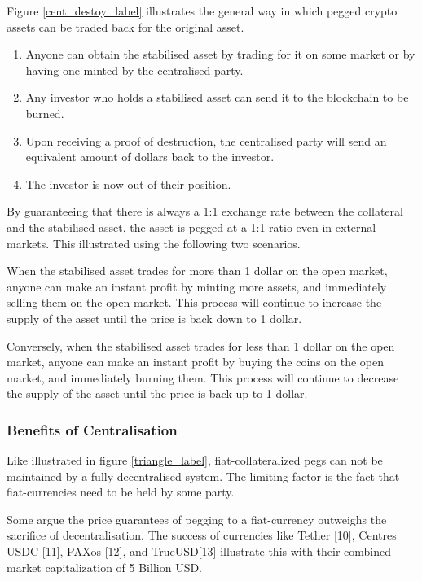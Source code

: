 \documentclass[english,]{IEEEtran}
\providecommand{\tightlist}{%
  \setlength{\itemsep}{0pt}\setlength{\parskip}{0pt}}
\begin{document}
Figure \ref{cent_destoy_label} illustrates the general way in which
pegged crypto assets can be traded back for the original asset.

\begin{enumerate}
\def\labelenumi{\arabic{enumi}.}
\setcounter{enumi}{-1}
\tightlist
\item
  Anyone can obtain the stabilised asset by trading for it on some
  market or by having one minted by the centralised party.
\item
  Any investor who holds a stabilised asset can send it to the
  blockchain to be burned.
\item
  Upon receiving a proof of destruction, the centralised party will send
  an equivalent amount of dollars back to the investor.
\item
  The investor is now out of their position.
\end{enumerate}

By guaranteeing that there is always a 1:1 exchange rate between the
collateral and the stabilised asset, the asset is pegged at a 1:1 ratio
even in external markets. This illustrated using the following two
scenarios.

When the stabilised asset trades for more than 1 dollar on the open
market, anyone can make an instant profit by minting more assets, and
immediately selling them on the open market. This process will continue
to increase the supply of the asset until the price is back down to 1
dollar.

Conversely, when the stabilised asset trades for less than 1 dollar on
the open market, anyone can make an instant profit by buying the coins
on the open market, and immediately burning them. This process will
continue to decrease the supply of the asset until the price is back up
to 1 dollar.

\subsubsection{Benefits of
Centralisation}\label{benefits-of-centralisation}

Like illustrated in figure \ref{triangle_label}, fiat-collateralized
pegs can not be maintained by a fully decentralised system. The limiting
factor is the fact that fiat-currencies need to be held by some party.

Some argue the price guarantees of pegging to a fiat-currency outweighs
the sacrifice of decentralisation. The success of currencies like Tether
{[}10{]}, Centres USDC {[}11{]}, PAXos {[}12{]}, and TrueUSD{[}13{]}
illustrate this with their combined market capitalization of 5 Billion
USD.
\end{document}
